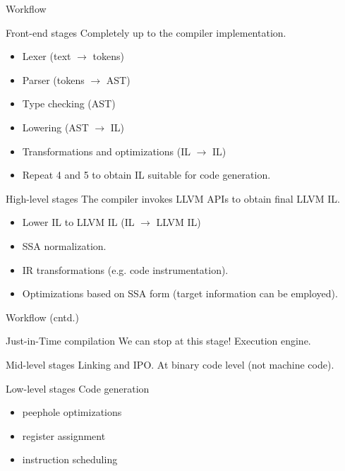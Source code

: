 \documentclass[8pt]{beamer}
\begin{document}
\begin{frame}{Workflow}
  \begin{block}{Front-end stages}
    Completely up to the compiler implementation.
    \begin{itemize}
      \item Lexer (text $\rightarrow$ tokens)
      \item Parser (tokens $\rightarrow$ AST)
      \item Type checking (AST)
      \item Lowering (AST $\rightarrow$ IL)
      \item Transformations and optimizations (IL $\rightarrow$ IL)
      \item Repeat 4 and 5 to obtain IL suitable for code generation.
    \end{itemize}
  \end{block}
  
  \begin{block}{High-level stages}
    The compiler invokes LLVM APIs to obtain final LLVM IL.
    \begin{itemize}
      \item Lower IL to LLVM IL (IL $\rightarrow$ LLVM IL)
      \item SSA normalization.
      \item IR transformations (e.g. code instrumentation).
      \item Optimizations based on SSA form (target information can be
        employed).
    \end{itemize}
  \end{block}
\end{frame}

\begin{frame}{Workflow (cntd.)}
  \begin{block}{Just-in-Time compilation}
    We can stop at this stage! Execution engine.
  \end{block}

  \begin{block}{Mid-level stages}
    Linking and IPO. At binary code level (not machine code).
  \end{block}

  \begin{block}{Low-level stages}
    Code generation
    \begin{itemize}
      \item peephole optimizations
      \item register assignment
      \item instruction scheduling
    \end{itemize}
  \end{block}
\end{frame}
\end{document}
